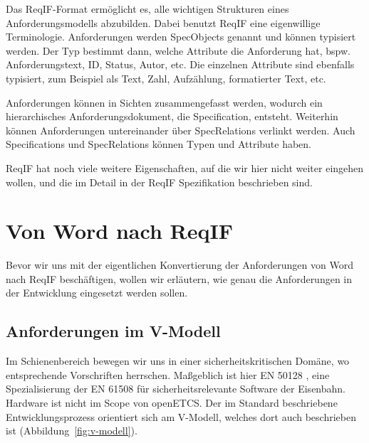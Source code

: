 \documentclass[twoside]{article}
\begin{document}
\begin{multicols}{2}
Das ReqIF-Format ermöglicht es, alle wichtigen Strukturen eines Anforderungsmodells abzubilden.  Dabei benutzt ReqIF eine eigenwillige Terminologie.  Anforderungen werden SpecObjects genannt und können typisiert werden.  Der Typ bestimmt dann, welche Attribute die Anforderung hat, bspw. Anforderungstext, ID, Status, Autor, etc. Die einzelnen Attribute sind ebenfalls typisiert, zum Beispiel als Text, Zahl, Aufzählung, formatierter Text, etc.

Anforderungen können in Sichten zusammengefasst werden, wodurch ein hierarchisches Anforderungsdokument, die Specification, entsteht.  Weiterhin können Anforderungen untereinander über SpecRelations verlinkt werden. Auch Specifications und SpecRelations können Typen und Attribute haben.

ReqIF hat noch viele weitere Eigenschaften, auf die wir hier nicht weiter eingehen wollen, und die im Detail in der ReqIF Spezifikation \cite{reqif} beschrieben sind.

\section{Von Word nach ReqIF}

Bevor wir uns mit der eigentlichen Konvertierung der Anforderungen von Word nach ReqIF beschäftigen, wollen wir erläutern, wie genau die Anforderungen in der Entwicklung eingesetzt werden sollen.

\subsection{Anforderungen im V-Modell}

Im Schienenbereich bewegen wir uns in einer sicherheitskritischen Domäne, wo entsprechende Vorschriften herrschen.  Maßgeblich ist hier EN 50128 \cite{en50128}, eine Spezialisierung der EN 61508 für sicherheitsrelevante Software der Eisenbahn.  Hardware ist nicht im Scope von openETCS.  Der im Standard beschriebene Entwicklungsprozess orientiert sich am V-Modell, welches dort auch beschrieben ist (Abbildung~\ref{fig:v-modell}). 


\end{multicols}
\end{document}
